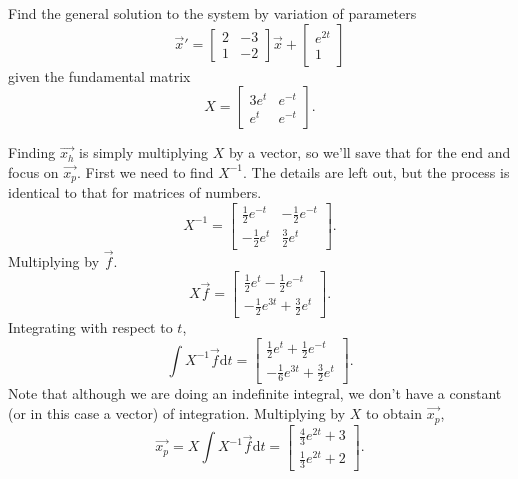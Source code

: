 \begin{example}
	Find the general solution to the system by variation of parameters
	\begin{equation*}
		\vec{x}' = \begin{bmatrix}
			2 & -3 \\
			1 & -2
		\end{bmatrix}\vec{x} + \begin{bmatrix}
			e^{2t} \\
			1
		\end{bmatrix}
	\end{equation*}
	given the fundamental matrix
	\begin{equation*}
		X = \begin{bmatrix}
			3e^t & e^{-t} \\
			e^t & e^{-t}
		\end{bmatrix}.
	\end{equation*}
\end{example}
\noindent
Finding $\vec{x_h}$ is simply multiplying $X$ by a vector, so we'll save that for the end and focus on $\vec{x_p}$. First we need to find $X^{-1}$. The details are left out, but the process is identical to that for matrices of numbers.
\begin{equation*}
	X^{-1} = \begin{bmatrix}
		\frac{1}{2}e^{-t} & -\frac{1}{2}e^{-t} \\
		-\frac{1}{2}e^t & \frac{3}{2}e^t
	\end{bmatrix}.
\end{equation*}
Multiplying by $\vec{f}$.
\begin{equation*}
	X\vec{f} = \begin{bmatrix}
		\frac{1}{2}e^t - \frac{1}{2}e^{-t} \\
		-\frac{1}{2}e^{3t} + \frac{3}{2}e^t
	\end{bmatrix}.
\end{equation*}
Integrating with respect to $t$,
\begin{equation*}
	\int{X^{-1}\vec{f} \mathrm{d}t} = \begin{bmatrix}
		\frac{1}{2}e^t + \frac{1}{2}e^{-t} \\
		-\frac{1}{6}e^{3t} + \frac{3}{2}e^t
	\end{bmatrix}.
\end{equation*}
Note that although we are doing an indefinite integral, we don't have a constant (or in this case a vector) of integration.
Multiplying by $X$ to obtain $\vec{x_p}$,
\begin{equation*}
	\vec{x_p} = X\int{X^{-1}\vec{f} \mathrm{d}t} = \begin{bmatrix}
		\frac{4}{3}e^{2t} + 3 \\
		\frac{1}{3}e^{2t} + 2
	\end{bmatrix}.
\end{equation*}
